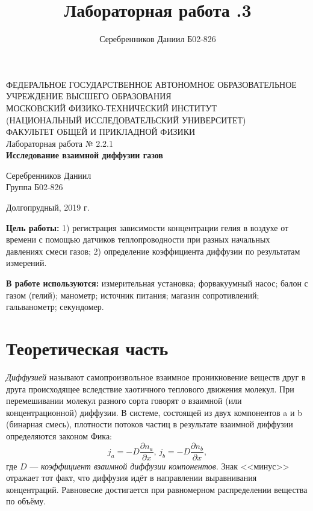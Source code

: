 \documentclass[a4paper,12pt]{article} %
\author{Серебренников Даниил Б02-826}
\title{Лабораторная работа \No 2.2.3}
\begin{document}
\begin{center}
\footnotesize{ФЕДЕРАЛЬНОЕ ГОСУДАРСТВЕННОЕ АВТОНОМНОЕ ОБРАЗОВАТЕЛЬНОЕ 			УЧРЕЖДЕНИЕ ВЫСШЕГО ОБРАЗОВАНИЯ}\\
\footnotesize{МОСКОВСКИЙ ФИЗИКО-ТЕХНИЧЕСКИЙ ИНСТИТУТ\\(НАЦИОНАЛЬНЫЙ 			ИССЛЕДОВАТЕЛЬСКИЙ УНИВЕРСИТЕТ)}\\
\footnotesize{ФАКУЛЬТЕТ ОБЩЕЙ И ПРИКЛАДНОЙ ФИЗИКИ\\}
\hfill \break
\hfill\break
\hfill\break
\hfill \break
\hfill \break
\hfill \break
\hfill \break
\hfill \break
\hfill \break
\hfill \break
\hfill \break
\hfill \break
\hfill \break
\hfill \break
\hfill \break
\large{Лабораторная работа № 2.2.1\\\textbf{Исследование взаимной диффузии газов}}\\
\hfill \break
\hfill \break
\hfill \break
\begin{flushright}
	Серебренников Даниил\\
	Группа Б02-826
\end{flushright}
\hfill \break
\hfill \break
\hfill \break
\hfill \break
\hfill \break
\end{center}
\hfill \break
\hfill \break
\hfill \break
\hfill \break
\hfill \break
\begin{center}
	Долгопрудный, 2019 г.
\end{center}
\thispagestyle{empty} %


\newpage
\textbf{Цель работы:} 1) регистрация зависимости концентрации гелия в воздухе от времени с помощью датчиков теплопроводности при разных начальных давлениях смеси газов; 2) определение коэффициента диффузии по результатам измерений.

\textbf{В работе используются:} измерительная установка; форвакуумный насос; балон с газом 	(гелий); манометр; источник питания; магазин сопротивлений; гальванометр; секундомер.


\section{Теоретическая часть}
	\textit{Диффузией}  называют самопроизвольное взаимное проникновение веществ друг в друга происходящее вследствие хаотичного теплового движения молекул. При перемешивании молекул разного сорта говорят о взаимной (или концентрационной) диффузии. В системе, состоящей из двух компонентов a и b (бинарная смесь), плотности потоков частиц в результате взаимной диффузии определяются законом Фика:
	\begin{equation}
		j_a = -D \frac{\partial n_a}{\partial x}, \, j_b = -D \frac{\partial n_b}{\partial x},
	\end{equation}
	где $D$ — \textit{коэффициент взаимной диффузии компонентов}. Знак <<минус>> отражает тот факт, что диффузия идёт в направлении выравнивания концентраций. Равновесие достигается при равномерном распределении вещества по объёму.
	
\end{document}
